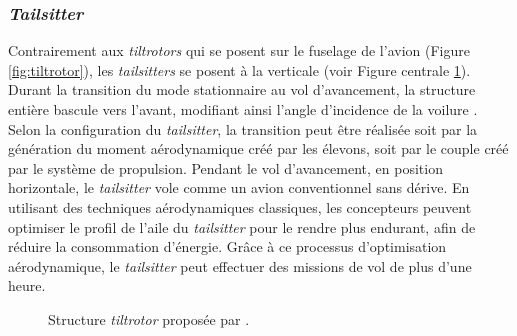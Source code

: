         \subsubsection*{\textit{Tailsitter}}
        Contrairement aux \textit{tiltrotors} qui se posent sur le fuselage de l'avion (Figure \ref{fig:tiltrotor}), les \textit{tailsitters} se posent à la verticale (voir Figure centrale \ref{fig:tailsitter}). Durant la transition du mode stationnaire au vol d'avancement, la structure entière bascule vers l'avant, modifiant ainsi l'angle d'incidence de la voilure \cite{RobinRaffaello2017, VerlingWeibelSiegwart2016,smeurINDITail, ChiappinelliNahon2018, tal2022global}. Selon la configuration du \textit{tailsitter}, la transition peut être réalisée soit par la génération du moment aérodynamique créé par les élevons, soit par le couple créé par le système de propulsion. Pendant le vol d'avancement, en position horizontale, le \textit{tailsitter} vole comme un avion conventionnel sans dérive. En utilisant des techniques aérodynamiques classiques, les concepteurs peuvent optimiser le profil de l'aile du \textit{tailsitter} pour le rendre plus endurant, afin de réduire la consommation d'énergie. Grâce à ce processus d'optimisation aérodynamique, le \textit{tailsitter} peut effectuer des missions de vol de plus d'une heure.

        \begin{figure}[ht!]
            \centering
            \caption{Structure \textit{tiltrotor}  proposée par \cite{smeurINDITail,fernandez:hal-04612206,pflimlin:tel-00132352}.}
            \label{fig:tailsitter}
        \end{figure}
        
